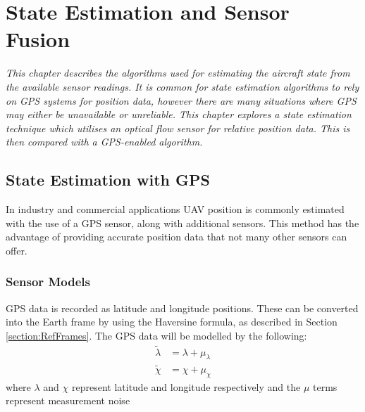 
\chapter{State Estimation and Sensor Fusion}
\textit{This chapter describes the algorithms used for estimating the aircraft state from the available sensor readings. It is common for state estimation algorithms to rely on GPS systems for position data, however there are many situations where GPS may either be unavailable or unreliable. This chapter explores a state estimation technique which utilises an optical flow sensor for relative position data. This is then compared with a GPS-enabled algorithm.}

\section{State Estimation with GPS}
In industry and commercial applications UAV position is commonly estimated with the use of a GPS sensor, along with additional sensors. This method has the advantage of providing accurate position data that not many other sensors can offer.

\subsection{Sensor Models}
GPS data is recorded as latitude and longitude positions. These can be converted into the Earth frame by using the Haversine formula, as described in Section \ref{section:RefFrames}. The GPS data will be modelled by the following:
\begin{equation}
\begin{split}
\tilde{\lambda}&=\lambda+\mu_{\lambda}\\
\tilde{\chi}&=\chi +\mu_{\chi}
\end{split}
\end{equation}
where $\lambda$ and $\chi$ represent latitude and longitude respectively and the $\mu$ terms represent measurement noise

